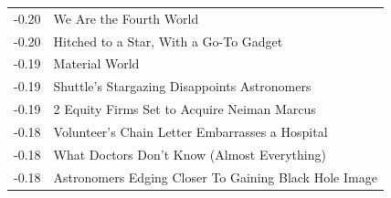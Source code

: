 \documentclass{article}
\begin{document}
\begin{center}
\begin{tabular}{ l p{8cm} }
-0.20	& We Are the Fourth World \\
-0.20	& Hitched to a Star, With a Go-To Gadget \\
-0.19	& Material World \\
-0.19	& Shuttle's Stargazing Disappoints Astronomers \\
-0.19	& 2 Equity Firms Set to Acquire Neiman Marcus \\
-0.18	& Volunteer's Chain Letter Embarrasses a Hospital \\
-0.18	& What Doctors Don't Know (Almost Everything) \\
-0.18	& Astronomers Edging Closer To Gaining Black Hole Image \\
\end{tabular}

\vfill

\pagebreak

\hspace{0pt}
\vfill


\end{center}
\end{document}
